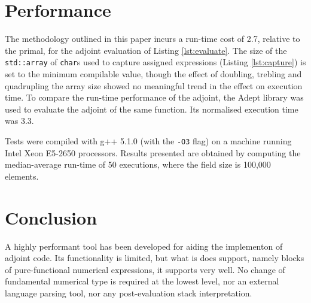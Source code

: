 \documentclass[a4paper,10pt]{article}
\begin{document}
\section{Performance}
The methodology outlined in this paper incurs a run-time cost of 2.7, relative to the primal, for the adjoint evaluation of Listing \ref{lst:evaluate}. The size of the \texttt{std::array} of \texttt{char}s used to capture assigned expressions (Listing \ref{lst:capture}) is set to the minimum compilable value, though the effect of doubling, trebling and quadrupling the array size showed no meaningful trend in the effect on execution time. To compare the run-time performance of the adjoint, the Adept library \citep{Hogan2014FRM} was used to evaluate the adjoint of the same function. Its normalised execution time was 3.3.

Tests were compiled with g++ 5.1.0 (with the \texttt{-O3} flag) on a machine running Intel Xeon E5-2650 processors. Results presented are obtained by computing the median-average run-time of 50 executions, where the field size is 100,000 elements.

\section{Conclusion}
A highly performant tool has been developed for aiding the implementon of adjoint code. Its functionality is limited, but what is does support, namely blocks of pure-functional numerical expressions, it supports very well. No change of fundamental numerical type is required at the lowest level, nor an external language parsing tool, nor any post-evaluation stack interpretation.



\end{document}

